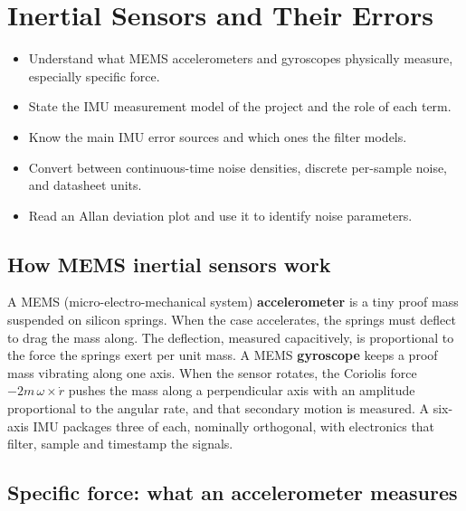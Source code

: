 \chapter{Inertial Sensors and Their Errors}
\label{ch:imu}

\begin{objectives}
\begin{itemize}
  \item Understand what MEMS accelerometers and gyroscopes physically measure, especially specific force.
  \item State the IMU measurement model of the project and the role of each term.
  \item Know the main IMU error sources and which ones the filter models.
  \item Convert between continuous-time noise densities, discrete per-sample noise, and datasheet units.
  \item Read an Allan deviation plot and use it to identify noise parameters.
\end{itemize}
\end{objectives}

\section{How MEMS inertial sensors work}

A MEMS (micro-electro-mechanical system) \textbf{accelerometer} is a tiny proof mass suspended on silicon
springs. When the case accelerates, the springs must deflect to drag the mass along. The deflection,
measured capacitively, is proportional to the force the springs exert per unit mass. A MEMS
\textbf{gyroscope} keeps a proof mass vibrating along one axis. When the sensor rotates, the Coriolis
force $-2m\,\omega\times\dot r$ pushes the mass along a perpendicular axis with an amplitude proportional to the
angular rate, and that secondary motion is measured. A six-axis IMU packages three of each, nominally
orthogonal, with electronics that filter, sample and timestamp the signals.

\section{Specific force: what an accelerometer measures}


